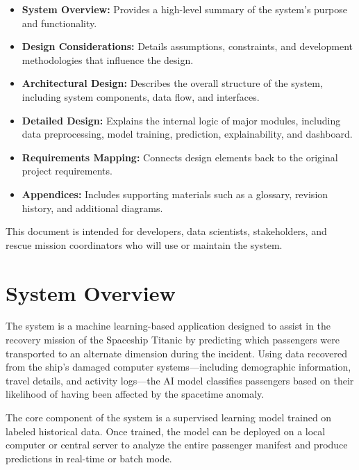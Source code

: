 \documentclass[15pt]{article}
\begin{document}
\begin{itemize}
    \item \textbf{System Overview:} Provides a high-level summary of the system’s purpose and functionality.
    \item \textbf{Design Considerations:} Details assumptions, constraints, and development methodologies that influence the design.
    \item \textbf{Architectural Design:} Describes the overall structure of the system, including system components, data flow, and interfaces.
    \item \textbf{Detailed Design:} Explains the internal logic of major modules, including data preprocessing, model training, prediction, explainability, and dashboard.
    \item \textbf{Requirements Mapping:} Connects design elements back to the original project requirements.
    \item \textbf{Appendices:} Includes supporting materials such as a glossary, revision history, and additional diagrams.
\end{itemize}

This document is intended for developers, data scientists, stakeholders, and rescue mission coordinators who will use or maintain the system.

\section{System Overview}

The system is a machine learning-based application designed to assist in the recovery mission of the Spaceship Titanic by predicting which passengers were transported to an alternate dimension during the incident. Using data recovered from the ship's damaged computer systems—including demographic information, travel details, and activity logs—the AI model classifies passengers based on their likelihood of having been affected by the spacetime anomaly.

The core component of the system is a supervised learning model trained on labeled historical data. Once trained, the model can be deployed on a local computer or central server to analyze the entire passenger manifest and produce predictions in real-time or batch mode. 
\end{document}
